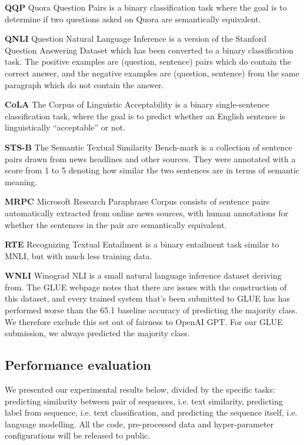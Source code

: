 \noindent \textbf{QQP} Quora Question Pairs is a binary classification task where the goal is to determine if two questions asked on Quora are semantically equivalent.

\noindent \textbf{QNLI} Question Natural Language Inference is a version of the Stanford Question Answering Dataset which has been converted to a binary classification task. The positive examples are (question, sentence) pairs which do contain the correct answer, and the negative examples are (question, sentence) from the same paragraph which do not contain the answer.

\noindent \textbf{CoLA} The Corpus of Linguistic Acceptability is a binary single-sentence classification task, where the goal is to predict whether an English sentence is linguistically “acceptable” or not.

\noindent \textbf{STS-B} The Semantic Textual Similarity Bench-mark is a collection of sentence pairs drawn from news headlines and other sources. They were annotated with a score from 1 to 5 denoting how similar the two sentences are in terms of semantic meaning.

\noindent \textbf{MRPC} Microsoft Research Paraphrase Corpus consists of sentence pairs automatically extracted from online news sources, with human annotations for whether the sentences in the pair are semantically equivalent.

\noindent \textbf{RTE} Recognizing Textual Entailment is a binary entailment task similar to MNLI, but with much less training data.

\noindent \textbf{WNLI} Winograd NLI is a small natural language inference dataset deriving from. The GLUE webpage notes that there are issues with the construction of this dataset, and every trained system that’s been submitted to GLUE has has performed worse than the 65.1 baseline accuracy of predicting the majority class. We therefore exclude this set out of fairness to OpenAI GPT. For our GLUE submission, we always predicted the majority class.


\subsection{Performance evaluation}
We presented our experimental results below, divided by the specific tasks: predicting similarity between pair of sequences, i.e. text similarity, 
predicting label from sequence, i.e. text classification, 
and predicting the sequence itself, i.e. language modelling. 
All the code, pre-processed data and hyper-parameter configurations will be released to public.




